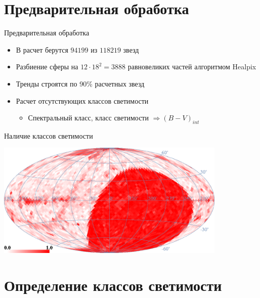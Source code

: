 \documentclass[14pt, fleqn, xcolor={dvipsnames, table}]{beamer}
\begin{document}
    \section{Предварительная обработка}                
        
        \begin{frame}{Предварительная обработка}
            \begin{itemize}
                \item В расчет берутся $94199$ из $118219$ звезд
                \item Разбиение сферы на $12 \cdot 18^2 = 3888$ равновеликих частей алгоритмом Healpix
                \item Тренды строятся по 90\% расчетных звезд
                \item Расчет отсутствующих классов светимости
                \begin{itemize}
                    \item Спектральный класс, класс светимости $\Longrightarrow (B - V)_{int}$
                \end{itemize}
            \end{itemize}
        \end{frame}
        
        \begin{frame}{Наличие классов светимости}
            \begin{center}
                \includegraphics[width=11cm]{has-lumin.eps}
            \end{center}             
        \end{frame}

    \section{Определение классов светимости}                
        
\end{document}
